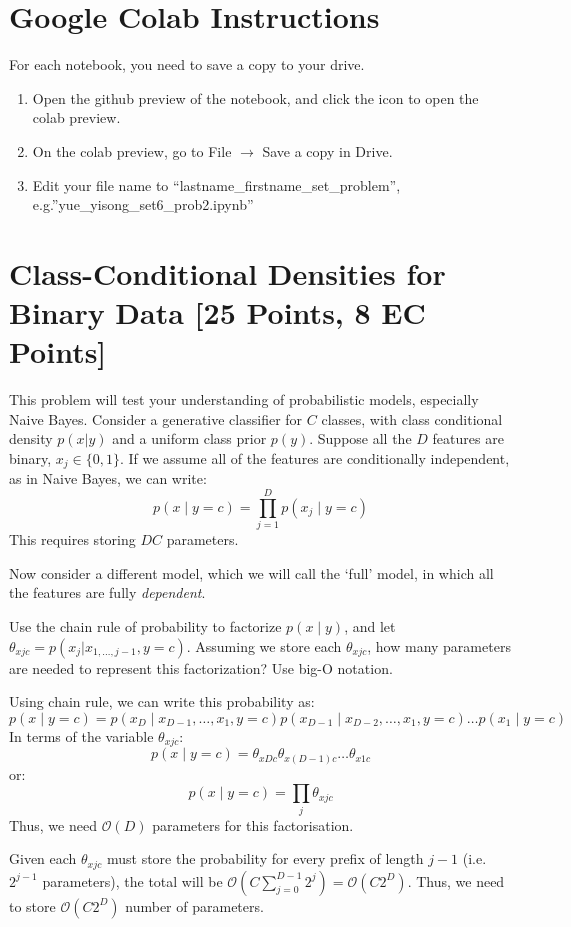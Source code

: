 \section*{Google Colab Instructions}
For each notebook, you need to save a copy to your drive.
\begin{enumerate}
	\item Open the github preview of the notebook, and click the icon to open the colab preview.
	\item On the colab preview, go to File $\rightarrow$ Save a copy in Drive.
	\item Edit your file name to “lastname_firstname_set_problem”, e.g.”yue_yisong_set6_prob2.ipynb”
\end{enumerate}

\newpage

\section{Class-Conditional Densities for Binary Data [25 Points, 8 EC Points]}
This problem will test your understanding of probabilistic models, especially Naive Bayes.
Consider a generative classifier for $C$ classes, with class conditional density $p(x | y)$ and a uniform class prior $p(y)$. Suppose all the $D$ features are binary, $x_j \in \{0, 1 \}$. If we assume all of the features are conditionally independent, as in Naive Bayes, we can write:
$$p(x \mid y = c) = \prod_{j=1}^D p(x_j \mid y = c) $$
This requires storing $DC$ parameters. 

Now consider a different model, which we will call the `full' model, in which all the features are fully \textit{dependent}.

\problem[9] Use the chain rule of probability to factorize $p(x \mid y)$, and let $\theta_{xjc} = p(x_j | x_{1, \ldots, j - 1}, y = c)$. Assuming we store each $\theta_{xjc}$, how many parameters are needed to represent this factorization? Use big-O notation. 

\begin{solution}
  Using chain rule, we can write this probability as:
  \begin{equation}
    p(x \mid y = c) = p(x_D\mid x_{D-1},\hdots,x_1,y=c)p(x_{D-1}\mid x_{D-2},\hdots,x_1,y=c)\hdots p(x_1 \mid y=c)
  \end{equation}
  In terms of the variable $\theta_{xjc}$:
  \begin{equation}
    p(x \mid y = c) = \theta_{xDc}\theta_{x(D-1)c}\hdots\theta_{x1c}
  \end{equation}
  or:
  \begin{equation}
    p(x \mid y = c) = \prod_j\theta_{xjc}
  \end{equation}
  Thus, we need $\mathcal{O}(D)$ parameters for this factorisation.

  Given each $\theta_{xjc}$ must store the probability for every prefix of length $j-1$ (i.e. $2^{j-1}$ parameters), the total will be $\mathcal{O}\left(C\sum_{j=0}^{D-1}2^j\right)=\mathcal{O}(C2^D)$. Thus, we need to store $\mathcal{O}(C2^D)$ number of parameters.
\end{solution}

